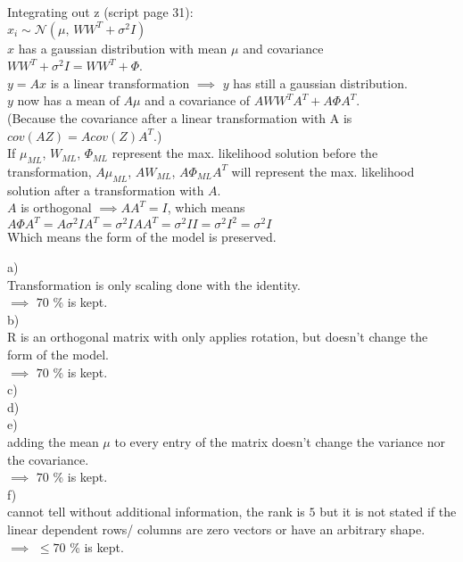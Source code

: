 %
\begin{flushleft}
Integrating out z (script page 31):\\
$x_i \sim \mathcal{N}(\mu, \, W W^{T} + \sigma^{2}I)$\\
$x$ has a gaussian distribution with mean $\mu$ and covariance 
$W W^{T} + \sigma^{2}I = W W^{T} + \Phi$.\\
$y = Ax$ is a linear transformation $\implies$ $y$ has still a gaussian distribution.\\
$y$ now has a mean of $A\mu$ and a covariance of $AW W^{T}A^{T} + A \Phi A^{T}$.\\
(Because the covariance after a linear transformation with A is $cov(AZ)=Acov(Z)A^{T}$.)\\
If $\mu_{ML}$, $W_{ML}$, $\Phi_{ML}$ represent the max. likelihood solution before the transformation, $A\mu_{ML}$, $AW_{ML}$, $A\Phi_{ML}A^{T}$ will represent the max. likelihood solution after a transformation with $A$.\\
$A$ is orthogonal $\implies AA^{T}=I$, which means $A \Phi A^{T} = A \sigma^{2}I A^{T} = \sigma^{2}I A A^{T} = \sigma^{2}I I = \sigma^{2}I^{2} = \sigma^{2}I$\\
Which means the form of the model is preserved.

\end{flushleft}
%
%
%
\begin{flushleft}
a)
\\
Transformation is only scaling done with the identity.
\\ $\implies$ $70$ \% is kept. 
\\
b)
\\
R is an orthogonal matrix with only applies rotation, but doesn't change the form of
the model.
\\ $\implies$ $70$ \% is kept.
\\
c)
\\
d)
\\
e)
\\
adding the mean $\mu$ to every entry of the matrix doesn't change the variance nor the 
covariance. \\$\implies$ $70$ \% is kept.
\\
f)
\\
cannot tell without additional information, the rank is $5$ but it is not stated if
the linear dependent rows/ columns are zero vectors or have an arbitrary shape.
\\ $\implies$ $\leq 70$ \% is kept.

\end{flushleft}
